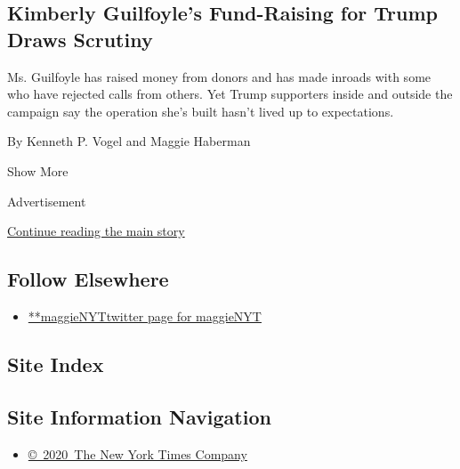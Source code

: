 \begin{enumerate}
{  \subsection{Kimberly Guilfoyle's Fund-Raising for Trump Draws
  Scrutiny}\label{kimberly-guilfoyles-fund-raising-for-trump-draws-scrutiny}}

  Ms. Guilfoyle has raised money from donors and has made inroads with
  some who have rejected calls from others. Yet Trump supporters inside
  and outside the campaign say the operation she's built hasn't lived up
  to expectations.

  By Kenneth P. Vogel and Maggie Haberman
\end{enumerate}

Show More

Advertisement

\protect\hyperlink{after-mid2}{Continue reading the main story}

\hypertarget{follow-elsewhere}{%
\subsection{Follow Elsewhere}\label{follow-elsewhere}}

\begin{itemize}
\tightlist
\item
  \href{https://twitter.com/maggieNYT}{**maggieNYTtwitter page for
  maggieNYT}
\end{itemize}

\hypertarget{site-index}{%
\subsection{Site Index}\label{site-index}}

\hypertarget{site-information-navigation}{%
\subsection{Site Information
Navigation}\label{site-information-navigation}}

\begin{itemize}
\tightlist
\item
  \href{https://help.nytimes3xbfgragh.onion/hc/en-us/articles/115014792127-Copyright-notice}{©~2020~The
  New York Times Company}
\end{itemize}

